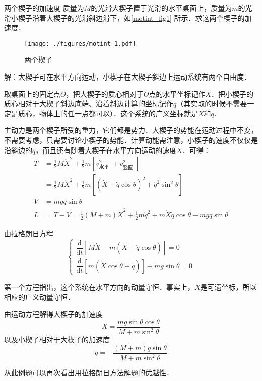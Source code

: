 \begin{example}{两个楔子的加速度}
质量为$M $的光滑大楔子置于光滑的水平桌面上，质量为$m$的光滑小楔子沿着大楔子的光滑斜边滑下，如\autoref{motint_fig1} 所示．求这两个楔子的加速度．
\begin{figure}[ht]
\centering
\texttt{[image: ./figures/motint\_1.pdf]}
\caption{两个楔子} \label{motint_fig1}
\end{figure}

解：大楔子可在水平方向运动，小楔子在大楔子斜边上运动系统有两个自由度．

取桌面上的固定点$O$，把大楔子的质心相对于$O$点的水平坐标记作$X $．把小楔子的质心相对于大楔子斜边底端、沿着斜边计算的坐标记作$q$（其实取的时候不需要一定是质心，物体上的任一点都可以）．这个系统的广义坐标就是$X $和$q $．

主动力是两个楔子所受的重力，它们都是势力．大楔子的势能在运动过程中不变，不需要考虑，只需要讨论小楔子的势能．计算动能需注意，小楔子的速度不仅仅是沿斜边的$\dot q$，而且还有随着大楔子在水平方向运动的速度$\dot X$．可得：
\begin{equation}
\begin{aligned} T &=\frac{1}{2} M \dot{X}^{2}+\frac{1}{2} m\left[v_{\text {水平 }}^{2}+v_{\text {竖直 }}^{2}\right] \\ &=\frac{1}{2} M \dot{X}^{2}+\frac{1}{2} m\left[(\dot{X}+\dot{q} \cos \theta)^{2}+\dot{q}^{2} \sin ^{2} \theta\right] \\ V &=m g q \sin \theta \\ L &=T-V=\frac{1}{2}(M+m) \dot{X}^{2}+\frac{1}{2} m \dot{q}^{2}+m \dot{X} \dot{q} \cos \theta-m g q \sin \theta \end{aligned}
\end{equation}

由拉格朗日方程
\begin{equation}
\begin{cases}
\dfrac{\mathrm{d}}{\mathrm{d} t}[M \dot{X}+m(\dot{X}+\dot{q} \cos \theta)]=0 \\ \dfrac{\mathrm{d}}{\mathrm{d} t}[m(\dot{X} \cos \theta+\dot{q})]+m g \sin \theta=0
\end{cases}
\end{equation}

第一个方程指出，这个系统在水平方向的动量守恒．事实上，$X$是可遗坐标，所以相应的广义动量守恒．

由运动方程解得大楔子的加速度
\begin{equation}
\ddot{X}=\frac{m g \sin \theta \cos \theta}{M+m \sin ^{2} \theta}
\end{equation}
以及小楔子相对于大楔子的加速度
\begin{equation}
\ddot{q}=-\frac{(M+m) g \sin \theta}{M+m \sin ^{2} \theta}
\end{equation}
\end{example}
从此例题可以再次看出用拉格朗日方法解题的优越性．

